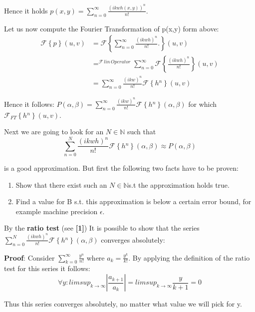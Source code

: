 Hence it holds $p(x,y)=\sum_{n=0}^{\infty}\frac{(ikwh(x,y))^{n}}{n!}.$

Let us now compute the Fourier Transformation of p(x,y) form above:
\begin{align*}
  \mathcal{F}\left\{ p\right\}(u,v)
  & =\mathcal{F}\left\{ \sum_{n=0}^{\infty}\frac{(ikwh)^{n}}{n!}.\right\}(u,v) \\
  & =^{\mathcal{F}\, lin\, Operator}\sum_{n=0}^{\infty}\mathcal{F}\left\{ \frac{(ikwh)^{n}}{n!}\right\}(u,v) \\
  & =\sum_{n=0}^{\infty}\frac{(ikw)^{n}}{n!}\mathcal{F}\left\{ h{}^{n}\right\}(u,v)
\end{align*}

Hence it follows: $P(\alpha,\beta)=\sum_{n=0}^{\infty}\frac{(ikw)^{n}}{n!}\mathcal{F}\left\{ h{}^{n}\right\} (\alpha,\beta)$ for which $\mathcal{F}_{FT}\left\{ h{}^{n}\right\} (u,v)$.

Next we are going to look for an $N\mathbb{\in N}$ such that 
\begin{equation*}
 \sum_{n=0}^{N}\frac{(ikwh)^{n}}{n!}\mathcal{F}\left\{ h{}^{n}\right\} (\alpha,\beta) \approx P(\alpha,\beta) 
\end{equation*}

is a good approximation. But first the following two facts have to be proven:

\begin{enumerate}
\item Show that there exist such an $N\mathbb{\in N}$s.t the approximation
holds true.
\item Find a value for B s.t. this approximation is below a certain error
bound, for example machine precision $\epsilon$. 
\end{enumerate}


By the \textbf{ratio test} (see \textbf{{[}1{]}}) 
It is possible to show that the series $\sum_{n=0}^{N}\frac{(ikwh)^{n}}{n!}\mathcal{F}\left\{ h{}^{n}\right\} (\alpha,\beta)$ converges absolutely:

\textbf{Proof}: Consider $\sum_{k=0}^{\infty}\frac{y^{n}}{n!}$ where
$a_{k}=\frac{y^{k}}{k!}$. By applying the definition of the ratio test for this series it follows: 
\begin{equation*}
 \forall y:limsup_{k\rightarrow\infty}|\frac{a_{k+1}}{a_{k}}|=limsup_{k\rightarrow\infty}\frac{y}{k+1}=0 
\end{equation*}

Thus this series converges absolutely, no matter what value we will
pick for y.

